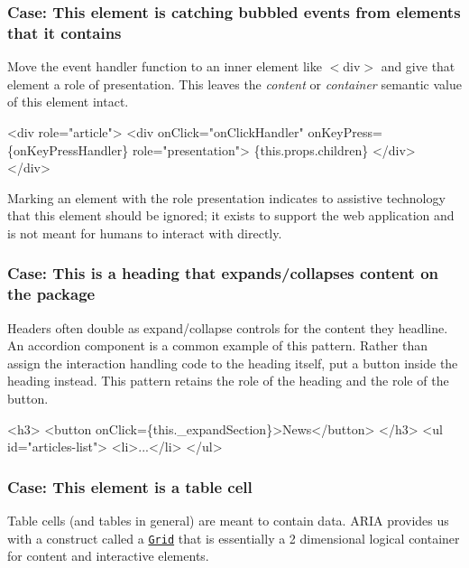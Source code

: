 \subsubsection*{Case\+: This element is catching bubbled events from elements that it contains}

Move the event handler function to an inner element like {\ttfamily $<$div$>$} and give that element a role of {\ttfamily presentation}. This leaves the {\itshape content} or {\itshape container} semantic value of this element intact.


\begin{DoxyCode}
<div role="article">
  <div
    onClick="onClickHandler"
    onKeyPress=\{onKeyPressHandler\}
    role="presentation">
    \{this.props.children\}
  </div>
</div>
\end{DoxyCode}


Marking an element with the role {\ttfamily presentation} indicates to assistive technology that this element should be ignored; it exists to support the web application and is not meant for humans to interact with directly.

\subsubsection*{Case\+: This is a heading that expands/collapses content on the package}

Headers often double as expand/collapse controls for the content they headline. An accordion component is a common example of this pattern. Rather than assign the interaction handling code to the heading itself, put a button inside the heading instead. This pattern retains the role of the heading and the role of the button.


\begin{DoxyCode}
<h3>
  <button onClick=\{this.\_expandSection\}>News</button>
</h3>
<ul id="articles-list">
  <li>...</li>
</ul>
\end{DoxyCode}


\subsubsection*{Case\+: This element is a table cell}

Table cells (and tables in general) are meant to contain data. A\+R\+IA provides us with a construct called a \href{http://w3c.github.io/aria-practices/#grid}{\tt Grid} that is essentially a 2 dimensional logical container for content and interactive elements.

